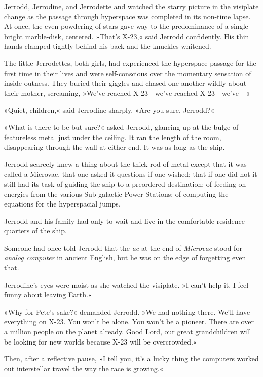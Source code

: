 \documentclass[11pt,twocolumn,paper=a5,pagesize,twoside]{scrartcl}
\newcommand{\q}[1]{»#1«}
\newcommand{\futureone}[1]{ #1 }
\newcommand{\initial}[1]{ \lettrine[lines=3,lhang=0.3,nindent=0em]{  {\textsf{#1}}}{}}
\newcommand{\initialb}[1]{ \lettrine[lines=3,lhang=0.3,nindent=1em]{  {\textsf{#1}}}{}}
\begin{document}
\futureone{
\initial{J}errodd, Jerrodine, and Jerrodette \MakeUppercase{\romannumeral 1}
and \MakeUppercase{\romannumeral 2} watched the starry picture in the 
visiplate change as the passage through hyperspace was completed in its 
non-time lapse. At once, the even powdering of stars gave way to the 
predominance of a single bright marble-disk, centered.
\q{That's X-23,} said Jerrodd confidently. His thin hands clamped tightly 
behind his back and the knuckles whitened.

The little Jerrodettes, both girls, had experienced the hyperspace passage 
for the first time in their lives and were self-conscious over the momentary 
sensation of inside-outness. They buried their giggles and chased one another 
wildly about their mother, screaming, \q{We've reached X-23---we've reached 
X-23---we've---}

\q{Quiet, children,} said Jerrodine sharply. \q{Are you sure, Jerrodd?}

\q{What is there to be but sure?} asked Jerrodd, glancing up at the bulge 
of featureless metal just under the ceiling. It ran the length of the room, 
disappearing through the wall at either end. It was as long as the ship.

Jerrodd scarcely knew a thing about the thick rod of metal except that it 
was called a Microvac, that one asked it questions if one wished; that if 
one did not it still had its task of guiding the ship to a preordered 
destination; of feeding on energies from the various Sub-galactic Power 
Stations; of computing the equations for the hyperspacial jumps.

Jerrodd and his family had only to wait and live in the comfortable residence 
quarters of the ship.

Someone had once told Jerrodd that the \textit{ac} at the end of 
\textit{Microvac} stood for \textit{analog computer} in ancient English, but 
he was on the edge of forgetting even that.

Jerrodine's eyes were moist as she watched the visiplate. \q{I can't help it. 
I feel funny about leaving Earth.}

\q{Why for Pete's sake?} demanded Jerrodd. \q{We had nothing there. We'll 
have everything on X-23. You won't be alone. You won't be a pioneer. There 
are over a million people on the planet already. Good Lord, our great 
grandchildren will be looking for new worlds because X-23 will be overcrowded.}

Then, after a reflective pause, \q{I tell you, it's a lucky thing the 
computers worked out interstellar travel the way the race is growing.}

}
\end{document}
